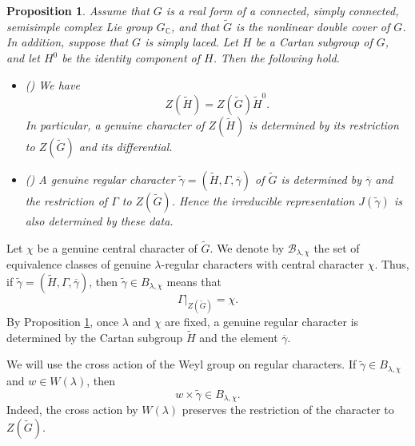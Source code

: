 \documentclass{amsart}
\newtheorem{prop}[thm]{Proposition}
\theoremstyle{definition}
\newcommand{\tu}{\widetilde}
\begin{document}
\begin{prop}\label{prop:genuine-character-determined}
Assume that $G$ is a real form of a connected, simply connected, semisimple complex Lie group $G_{\mathbb C}$, and that $\widetilde G$ is the nonlinear double cover of $G$. In addition, suppose that $G$ is simply laced. Let $H$ be a Cartan subgroup of $G$, and let $H^0$ be the identity component of $H$. Then the following hold.
\begin{itemize}
\item[(1)] \textup{(\cite[Proposition 4.7]{AHe10})} We have
\begin{equation*}
Z(\widetilde H)=Z(\widetilde G)\widetilde H^0.
\end{equation*}
In particular, a genuine character of $Z(\widetilde H)$ is determined by its restriction to $Z(\widetilde G)$ and its differential.

\item[(2)] \textup{(\cite[Proposition 5.5]{AT12})}
A genuine regular character
$\tu\gamma=(\widetilde H,\Gamma,\overline\gamma)$
of $\widetilde G$ is determined by $\overline\gamma$ and the restriction of $\Gamma$ to $Z(\widetilde G)$. Hence the irreducible representation $J(\tu\gamma)$ is also determined by these data.
\end{itemize}
\end{prop}



Let $\chi$ be a genuine central character of $\widetilde G$. We denote by $\mathcal B_{\lambda,\chi}$ the set of equivalence classes of genuine $\lambda$-regular characters with central character $\chi$. Thus, if $\tu\gamma=(\widetilde H,\Gamma,\overline\gamma)$, then $\tu\gamma\in B_{\lambda,\chi}$ means that
\begin{equation*}
\Gamma|_{Z(\widetilde G)}=\chi.
\end{equation*}
By Proposition \ref{prop:genuine-character-determined}, once $\lambda$ and $\chi$ are fixed, a genuine regular character is determined by the Cartan subgroup $\widetilde H$ and the element $\overline\gamma$.

We will use the cross action of the Weyl group on regular characters. If $\tu\gamma\in B_{\lambda,\chi}$ and $w\in W(\lambda)$, then
\begin{equation*}
w\times \tu\gamma\in B_{\lambda,\chi}.
\end{equation*}
Indeed, the cross action by $W(\lambda)$ preserves the restriction of the character to $Z(\widetilde G)$.
\end{document}
